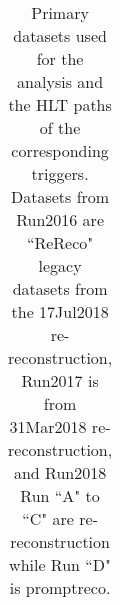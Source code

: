 \begin{table}[!ht]
\begin{center}
{\begin{tabular}{|l|l|}
\end{tabular}
}
\end{center}
\caption[Data Samples]{\label{tab:datasets}Primary datasets used for the analysis and the HLT paths of the corresponding triggers. Datasets from Run2016 are ``ReReco" legacy datasets from the 17Jul2018 re-reconstruction, Run2017 is from 31Mar2018 re-reconstruction, and Run2018 Run ``A" to ``C" are re-reconstruction while Run ``D" is promptreco.}
\end{table}

